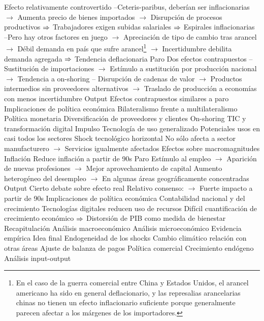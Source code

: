 \documentclass{nuevotema}
\begin{document}
\begin{esquemal}
				\4[] Efecto relativamente controvertido
				\4[] --Ceteris-paribus, deberían ser inflacionarias
				\4[] $\to$ Aumenta precio de bienes importados
				\4[] $\to$ Disrupción de procesos productivos
				\4[] $\Rightarrow$ Trabajadores exigen subidas salariales
				\4[] $\Rightarrow$ Espirales inflacionarias
				\4[] --Pero hay otros factores en juego
				\4[] $\to$ Apreciación de tipo de cambio tras arancel
				\4[] $\to$ Débil demanda en país que sufre arancel\footnote{En el caso de la guerra comercial entre China y Estados Unidos, el arancel americano ha sido en general deflacionario, y las represalias arancelarias chinas no tienen un efecto inflacionario suficiente porque generalmente parecen afectar a los márgenes de los importadores.}
				\4[] $\to$ Incertidumbre debilita demanda agregada
				\4[] $\Rightarrow$ Tendencia deflacionaria
				\4 Paro
				\4[] Dos efectos contrapuestos
				\4[] -- Sustitución de importaciones
				\4[] $\to$ Estímulo a sustitución por producción nacional
				\4[] $\to$ Tendencia a on-shoring
				\4[] -- Disrupción de cadenas de valor
				\4[] $\to$ Productos intermedios sin proveedores alternativos
				\4[] $\to$ Traslado de producción a economías con menos incertidumbre
				\4 Output
				\4[] Efectos contrapuestos similares a paro
			\3 Implicaciones de política económica
				\4 Bilateralismo frente a multilateralismo
				\4 Política monetaria
				\4 Diversificación de proveedores y clientes
				\4 On-shoring
		\2 TIC y transformación digital
			\3 Impulso
				\4 Tecnología de uso generalizado
				\4[] Potenciales usos en casi todos los sectores
				\4 Shock tecnológico horizontal
				\4[] No sólo afecta a sector manufacturero
				\4[] $\to$ Servicios igualmente afectados
			\3 Efectos sobre macromagnitudes
				\4 Inflación
				\4[] Reduce inflación a partir de 90s
				\4 Paro
				\4[] Estímulo al empleo
				\4[] $\to$ Aparición de nuevas profesiones
				\4[] $\to$ Mejor aprovechamiento de capital
				\4[] Aumento heterogéneo del desempleo
				\4[] $\to$ En algunas áreas geográficamente concentradas
				\4 Output
				\4[] Cierto debate sobre efecto real
				\4[] Relativo consenso:
				\4[] $\to$ Fuerte impacto a partir de 90s
			\3 Implicaciones de política económica
				\4 Contabilidad nacional y del crecimiento
				\4[] Tecnologías digitales reducen uso de recursos
				\4[] Difícil cuantificación de crecimiento económico
				\4[] $\Rightarrow$ Distorsión de PIB como medida de bienestar
	\1[] 
		\2 Recapitulación
			\3 Análisis macroeconómico
			\3 Análisis microeconómico
			\3 Evidencia empírica
		\2 Idea final
			\3 Endogeneidad de los shocks
			\3 Cambio climático
			\3 relación con otras áreas
				\4 Ajuste de balanza de pagos
				\4 Política comercial
				\4 Crecimiento endógeno
				\4 Análisis input-output
\end{esquemal}
\end{document}
